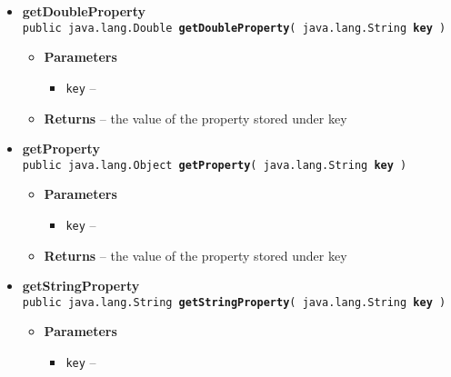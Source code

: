 {{{\begin{itemize}
{\begin{itemize}
{Converts a String generated by toYAML() to the correct contents of the object
}
\item{
{\bf Parameters}
  \begin{itemize}
   \item{
{\tt in} -- }
  \end{itemize}
}%
\end{itemize}
}%
 \item{ 
{\bf getDoubleProperty}\\
{\tt public java.lang.Double\ {\bf getDoubleProperty}( {\tt java.lang.String} {\bf key} )
\label{amber.common.AmberMessage.getDoubleProperty(java.lang.String)}}%
\begin{itemize}
\item{
{\bf Parameters}
  \begin{itemize}
   \item{
{\tt key} -- }
  \end{itemize}
}%
\item{{\bf Returns} -- 
the value of the property stored under key 
}%
\end{itemize}
}%
 \item{ 
{\bf getProperty}\\
{\tt public java.lang.Object\ {\bf getProperty}( {\tt java.lang.String} {\bf key} )
\label{amber.common.AmberMessage.getProperty(java.lang.String)}}%
\begin{itemize}
\item{
{\bf Parameters}
  \begin{itemize}
   \item{
{\tt key} -- }
  \end{itemize}
}%
\item{{\bf Returns} -- 
the value of the property stored under key 
}%
\end{itemize}
}%
 \item{ 
{\bf getStringProperty}\\
{\tt public java.lang.String\ {\bf getStringProperty}( {\tt java.lang.String} {\bf key} )
\label{amber.common.AmberMessage.getStringProperty(java.lang.String)}}%
\begin{itemize}
\item{
{\bf Parameters}
  \begin{itemize}
   \item{
{\tt key} -- }
  \end{itemize}
}
\end{itemize}}
\end{itemize}}}}
